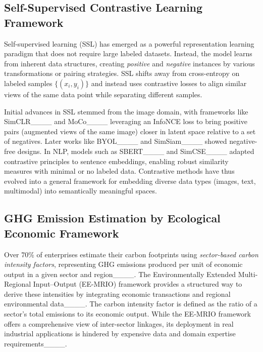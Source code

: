 \subsection{Self-Supervised Contrastive Learning Framework}
Self-supervised learning (SSL) has emerged as a powerful representation learning paradigm that does not require large labeled datasets. Instead, the model learns from inherent data structures, creating \emph{positive} and \emph{negative} instances by various transformations or pairing strategies. SSL shifts away from cross-entropy on labeled samples \(\{(x_i,y_i)\}\) and instead uses contrastive losses to align similar views of the same data point while separating different samples.

Initial advances in SSL stemmed from the image domain, with frameworks like SimCLR____ and MoCo____ leveraging an InfoNCE loss to bring positive pairs (augmented views of the same image) closer in latent space relative to a set of negatives. Later works like BYOL____ and SimSiam____ showed negative-free designs. In NLP, models such as SBERT____ and SimCSE____ adapted contrastive principles to sentence embeddings, enabling robust similarity measures with minimal or no labeled data. Contrastive methods have thus evolved into a general framework for embedding diverse data types (images, text, multimodal) into semantically meaningful spaces.

\subsection{GHG Emission Estimation by Ecological Economic Framework}
Over 70\% of enterprises estimate their carbon footprints using \emph{sector-based carbon intensity factors}, representing GHG emissions produced per unit of economic output in a given sector and region____. The Environmentally Extended Multi-Regional Input–Output (EE-MRIO) framework provides a structured way to derive these intensities by integrating economic transactions and regional environmental data____. The carbon intensity factor is defined as the ratio of a sector’s total emissions to its economic output. While the EE-MRIO framework offers a comprehensive view of inter-sector linkages, its deployment in real industrial applications is hindered by expensive data and domain expertise requirements____.